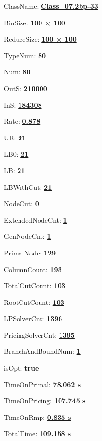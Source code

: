 \documentclass[11pt]{article}
\begin{document}
\pagestyle{empty}


ClassName: \underline{\textbf{Class_07.2bp-33}}
\par
BinSize: \underline{\textbf{100 × 100}}
\par
ReduceSize: \underline{\textbf{100 × 100}}
\par
TypeNum: \underline{\textbf{80}}
\par
Num: \underline{\textbf{80}}
\par
OutS: \underline{\textbf{210000}}
\par
InS: \underline{\textbf{184308}}
\par
Rate: \underline{\textbf{0.878}}
\par
UB: \underline{\textbf{21}}
\par
LB0: \underline{\textbf{21}}
\par
LB: \underline{\textbf{21}}
\par
LBWithCut: \underline{\textbf{21}}
\par
NodeCut: \underline{\textbf{0}}
\par
ExtendedNodeCnt: \underline{\textbf{1}}
\par
GenNodeCnt: \underline{\textbf{1}}
\par
PrimalNode: \underline{\textbf{129}}
\par
ColumnCount: \underline{\textbf{193}}
\par
TotalCutCount: \underline{\textbf{103}}
\par
RootCutCount: \underline{\textbf{103}}
\par
LPSolverCnt: \underline{\textbf{1396}}
\par
PricingSolverCnt: \underline{\textbf{1395}}
\par
BranchAndBoundNum: \underline{\textbf{1}}
\par
isOpt: \underline{\textbf{true}}
\par
TimeOnPrimal: \underline{\textbf{78.062 s}}
\par
TimeOnPricing: \underline{\textbf{107.745 s}}
\par
TimeOnRmp: \underline{\textbf{0.835 s}}
\par
TotalTime: \underline{\textbf{109.158 s}}
\par
\newpage


\end{document}
